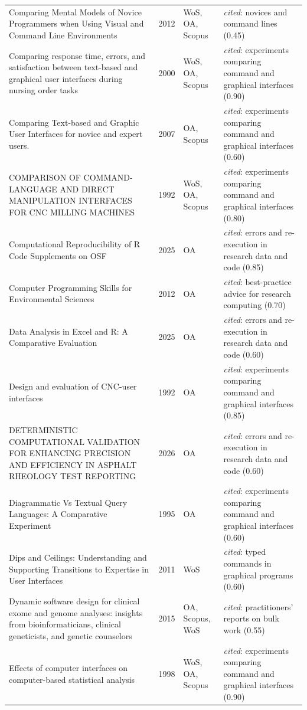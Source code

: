 \begin{longtable}{@{}%
  >{\raggedright\arraybackslash}p{}c%
  >{\raggedright\arraybackslash}p{}%
  >{\raggedright\arraybackslash}p{}@{}}
Comparing Mental Models of Novice Programmers when Using Visual and Command Line Environments & 2012 & WoS, OA, Scopus & \emph{cited}: novices and command lines (0.45) \\
Comparing response time, errors, and satisfaction between text-based and graphical user interfaces during nursing order tasks & 2000 & WoS, OA, Scopus & \emph{cited}: experiments comparing command and graphical interfaces (0.90) \\
Comparing Text-based and Graphic User Interfaces for novice and expert users. & 2007 & OA, Scopus & \emph{cited}: experiments comparing command and graphical interfaces (0.60) \\
COMPARISON OF COMMAND-LANGUAGE AND DIRECT MANIPULATION INTERFACES FOR CNC MILLING MACHINES & 1992 & WoS, OA, Scopus & \emph{cited}: experiments comparing command and graphical interfaces (0.80) \\
Computational Reproducibility of R Code Supplements on OSF & 2025 & OA & \emph{cited}: errors and re-execution in research data and code (0.85) \\
Computer Programming Skills for Environmental Sciences & 2012 & OA & \emph{cited}: best-practice advice for research computing (0.70) \\
Data Analysis in Excel and R: A Comparative Evaluation & 2025 & OA & \emph{cited}: errors and re-execution in research data and code (0.60) \\
Design and evaluation of CNC-user interfaces & 1992 & OA & \emph{cited}: experiments comparing command and graphical interfaces (0.85) \\
DETERMINISTIC COMPUTATIONAL VALIDATION FOR ENHANCING PRECISION AND EFFICIENCY IN ASPHALT RHEOLOGY TEST REPORTING & 2026 & OA & \emph{cited}: errors and re-execution in research data and code (0.60) \\
Diagrammatic Vs Textual Query Languages: A Comparative Experiment & 1995 & OA & \emph{cited}: experiments comparing command and graphical interfaces (0.60) \\
Dips and Ceilings: Understanding and Supporting Transitions to Expertise in User Interfaces & 2011 & WoS & \emph{cited}: typed commands in graphical programs (0.60) \\
Dynamic software design for clinical exome and genome analyses: insights from bioinformaticians, clinical geneticists, and genetic counselors & 2015 & OA, Scopus, WoS & \emph{cited}: practitioners' reports on bulk work (0.55) \\
Effects of computer interfaces on computer-based statistical analysis & 1998 & WoS, OA, Scopus & \emph{cited}: experiments comparing command and graphical interfaces (0.90) \\

\end{longtable}
